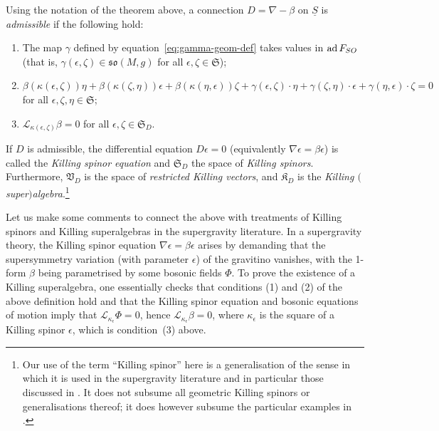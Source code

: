 \documentclass[11pt]{article}
\numberwithin{equation}{section}
\numberwithin{equation}{section}
\newcommand{\fso}{\mathfrak{so}}
\newcommand{\fK}{\mathfrak{K}}
\newcommand{\fS}{\mathfrak{S}}
\newcommand{\fV}{\mathfrak{V}}
\newcommand{\eL}{\mathscr{L}}
\newcommand{\Sbundle}{\underline{S}}
\newcommand{\1}{\mathbbm{1}}
\DeclareMathOperator{\ad}{ad}
\begin{document}
\begin{Definition}\label{def:killing-spinor}
	Using the notation of the theorem above, a connection $D=\nabla-\beta$ on $\Sbundle$ is \emph{admissible} if the following hold:
	\begin{enumerate}\itemsep=0pt
		\item The map $\gamma$ defined by equation~\eqref{eq:gamma-geom-def} takes values in $\ad F_{\rm SO}$ (that is, $\gamma(\epsilon,\zeta)\in\fso(M,g)$ for all $\epsilon,\zeta\in\fS$); %

		\item $
\beta(\kappa(\epsilon,\zeta))\eta + \beta(\kappa(\zeta,\eta))\epsilon + \beta(\kappa(\eta,\epsilon))\zeta
				+ \gamma(\epsilon,\zeta)\cdot\eta + \gamma(\zeta,\eta)\cdot\epsilon +\gamma(\eta,\epsilon)\cdot\zeta
				= 0$ for all $\epsilon,\zeta,\eta\in\fS$; %

		\item $\eL_{\kappa(\epsilon,\zeta)}\beta = 0$ for all $\epsilon,\zeta\in\fS_D$. %
	\end{enumerate}
	If $D$ is admissible, the differential equation $D\epsilon=0$ (equivalently $\nabla\epsilon =\beta\epsilon$) is called the \emph{Killing spinor equation} and $\fS_D$ the space of \emph{Killing spinors}. Furthermore, $\fV_D$ is the space of \emph{restricted Killing vectors}, and $\fK_D$ is the \emph{Killing $($super$)$algebra}.\footnote{Our use of the term ``Killing spinor'' here is a generalisation of the sense in which it is used in the supergravity literature and in particular those discussed in \cite{Beckett2021,deMedeiros2016,deMedeiros2018,Figueroa-OFarrill2017_1,Figueroa-OFarrill2017}. It does not subsume all geometric Killing spinors or generalisations thereof; it does however subsume the particular examples in \cite{Figueroa-OFarrill2008_except}.}
\end{Definition}

Let us make some comments to connect the above with treatments of Killing spinors and Killing superalgebras in the supergravity literature. In a supergravity theory, the Killing spinor equation $\nabla\epsilon=\beta\epsilon$ arises by demanding that the supersymmetry variation (with parameter $\epsilon$) of the gravitino vanishes, with the 1-form $\beta$ being parametrised by some bosonic fields $\Phi$. To prove the existence of a Killing superalgebra, one essentially checks that conditions (1) and (2) of the above definition hold and that the Killing spinor equation and bosonic equations of motion imply that $\eL_{\kappa_\epsilon}\Phi=0$, hence $\eL_{\kappa_\epsilon}\beta=0$, where $\kappa_\epsilon$ is the square of a Killing spinor $\epsilon$, which is condition~(3) above.
\end{document}
